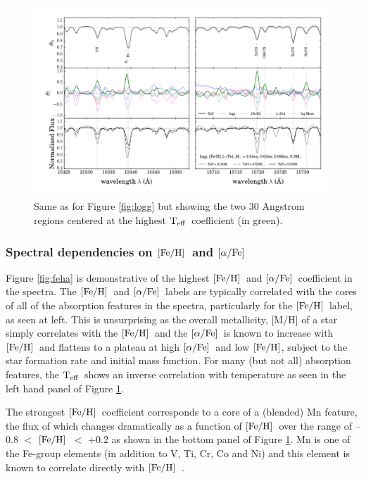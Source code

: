 \documentclass[12pt, preprint]{aastex}
\newcommand{\teff}{\mbox{$\rm T_{eff}$}}
\newcommand{\feh}{\mbox{$\rm [Fe/H]$}}
\newcommand{\alphafe}{\mbox{$\rm [\alpha/Fe]$}}
\begin{document}
\begin{figure}[h!]
\centering
    \includegraphics[scale=0.51]{./plots/coeffs_t_3.png}
  \caption{Same as for Figure \ref{fig:logg} but showing the two 30 Angstrom regions centered at the highest \teff\ coefficient (in green).}
\label{fig:teff}
\end{figure}



\subsubsection{Spectral dependencies on \feh\ and \alphafe} 

Figure \ref{fig:feha} is demonstrative of the highest \feh\ and \alphafe\ coefficient in the spectra. The \feh\ and \alphafe\ labels are typically correlated with the cores of all of the absorption features in the spectra, particularly for the \feh\ label, as seen at left. This is unsurprising as the overall metallicity,  [M/H] of  a star simply correlates with the \feh\ and the \alphafe\ is known to increase with \feh\ and flattens to a plateau at high \alphafe\ and low \feh, subject to the star formation rate and initial mass function. For many (but not all) absorption features, the \teff\ shows an inverse correlation with temperature as seen in the left hand panel of Figure \ref{fig:teff}. 

The strongest \feh\ coefficient corresponds to a core of a (blended) Mn feature, the flux of which changes dramatically as a function of \feh\ over the range of  --0.8 $<$ \feh\ $<$ +0.2 as shown in the bottom panel of Figure \ref{fig:teff}. Mn is one of the Fe-group elements (in addition to V, Ti, Cr, Co and Ni) and this element is known to correlate directly with \feh\ \citep[see][]{Maria2008, B2015}. 
\end{document}
